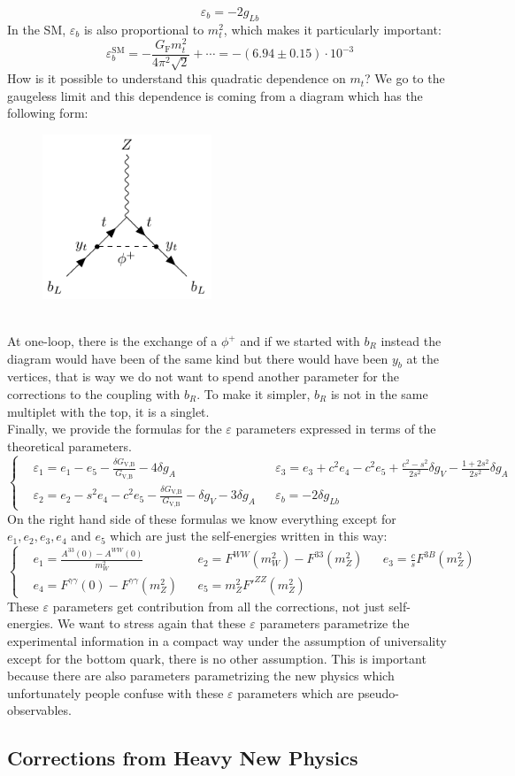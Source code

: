 \documentclass[../main.tex]{subfiles}
\begin{document}
\[
\varepsilon_b=-2g_{Lb}
\]
In the SM, $\varepsilon_b$ is also proportional to $m_t^2$, which makes it particularly important:
\[
\varepsilon_b^{\text{SM}}=-\frac{G_{\text{F}}m_t^2}{4\pi^2\sqrt{2}}+\cdots=-(6.94\pm0.15)\cdot10^{-3}
\]
How is it possible to understand this quadratic dependence on $m_t$? We go to the gaugeless limit and this dependence is coming from a diagram which has the following form:
\begin{figure}[h]
    \centering
    \includegraphics[width=0.45\textwidth]{Images/bl.pdf}
    \caption*{}
\end{figure}\\
At one-loop, there is the exchange of a $\phi^+$ and if we started with $b_R$ instead the diagram would have been of the same kind but there would have been $y_b$ at the vertices, that is way we do not want to spend another parameter for the corrections to the coupling with $b_R$. To make it simpler, $b_R$ is not in the same multiplet with the top, it is a singlet.\\
Finally, we provide the formulas for the $\varepsilon$ parameters expressed in terms of the theoretical parameters.
\[
\left\{
\begin{aligned}
&\varepsilon_1=e_1-e_5-\frac{\delta G_{\text{V,B}}}{G_{\text{V,B}}}-4\delta g_A &&\varepsilon_3=e_3+c^2e_4-c^2e_5+\frac{c^2-s^2}{2s^2}\delta g_V-\frac{1+2s^2}{2s^2}\delta g_A\\
&\varepsilon_2=e_2-s^2e_4-c^2e_5-\frac{\delta G_{\text{V,B}}}{G_{\text{V,B}}}-\delta g_V-3\delta g_A &&\varepsilon_b=-2\delta g_{Lb}
\end{aligned}
\right.
\]
On the right hand side of these formulas we know everything except for $e_1, e_2, e_3, e_4$ and $e_5$ which are just the self-energies written in this way:
\[
\left\{
\begin{aligned}
&e_1=\frac{A^{33}(0)-A^{WW}(0)}{m_W^2} &&e_2=F^{WW}(m_W^2)-F^{33}(m_Z^2) &&e_3=\frac{c}{s}F^{3B}(m_Z^2)\\
&e_4=F^{\gamma\gamma}(0)-F^{\gamma\gamma}(m_Z^2) &&e_5=m_Z^2F'^{ZZ}(m_Z^2)
\end{aligned}
\right.
\]
These $\varepsilon$ parameters get contribution from all the corrections, not just self-energies. We want to stress again that these $\varepsilon$ parameters parametrize the experimental information in a compact way under the assumption of universality except for the bottom quark, there is no other assumption. This is important because there are also parameters parametrizing the new physics which unfortunately people confuse with these $\varepsilon$ parameters which are pseudo-observables. 
\subsection{Corrections from Heavy New Physics}
\end{document}
